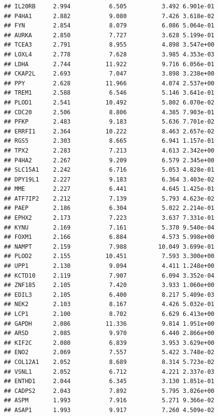\documentclass{article}\usepackage[]{graphicx}\usepackage[]{color}
\makeatletter
\newenvironment{kframe}{%
 \def\at@end@of@kframe{}%
 \ifinner\ifhmode%
  \def\at@end@of@kframe{\end{minipage}}%
  \begin{minipage}{\columnwidth}%
 \fi\fi%
 \def\FrameCommand##1{\hskip\@totalleftmargin \hskip-\fboxsep
 \colorbox{shadecolor}{##1}\hskip-\fboxsep
     \hskip-\linewidth \hskip-\@totalleftmargin \hskip\columnwidth}%
 \MakeFramed {\advance\hsize-\width
   \@totalleftmargin\z@ \linewidth\hsize
   \@setminipage}}%
 {\par\unskip\endMakeFramed%
 \at@end@of@kframe}
\newenvironment{knitrout}{}{} %
\makeatother
\begin{document}
\begin{knitrout}
\begin{kframe}
\begin{verbatim}
## IL20RB     2.994           6.505          3.492 6.901e-01
## P4HA1      2.882           9.080          7.426 3.618e-02
## FYN        2.854           8.079          6.086 5.064e-01
## AURKA      2.850           7.727          3.628 5.199e-01
## TCEA3      2.791           8.955          4.898 3.547e+00
## LOXL4      2.778           7.628          3.985 4.353e-03
## LDHA       2.744          11.922          9.716 6.056e-01
## CKAP2L     2.693           7.047          3.898 3.238e+00
## PPY        2.628          11.966          4.074 2.537e+00
## TREM1      2.588           6.546          5.146 3.641e-01
## PLOD1      2.541          10.492          5.802 6.070e-02
## CDC20      2.506           8.806          4.385 7.903e-01
## PFKP       2.483           9.183          5.636 7.701e-02
## ERRFI1     2.364          10.222          8.463 2.657e-02
## RGS5       2.303           8.665          6.941 1.157e-01
## TPX2       2.283           7.213          4.613 2.342e+00
## P4HA2      2.267           9.209          6.579 2.345e+00
## SLC15A1    2.242           6.716          5.053 4.828e-01
## DPY19L1    2.227           9.183          6.364 3.403e-02
## MME        2.227           6.441          4.645 1.425e-01
## ATF7IP2    2.212           7.139          5.793 4.623e-02
## PAEP       2.186           6.304          5.022 2.214e-01
## EPHX2      2.173           7.223          3.637 7.331e-01
## KYNU       2.169           7.161          5.370 9.540e-04
## FOXM1      2.166           6.884          4.573 5.998e+00
## NAMPT      2.159           7.988         10.049 3.699e-01
## PLOD2      2.155          10.451          7.593 3.300e+00
## UPP1       2.130           9.094          4.411 1.248e+00
## KCTD10     2.119           7.907          6.094 3.352e-04
## ZNF185     2.105           7.420          3.933 1.060e+00
## EDIL3      2.105           6.400          8.217 5.409e-03
## NEK2       2.103           8.167          4.426 5.032e-01
## LCP1       2.100           8.702          6.629 6.413e+00
## GAPDH      2.086          11.336          9.814 1.951e+00
## ARSD       2.085           9.970          6.440 2.866e+00
## KIF2C      2.080           6.839          3.953 3.629e+00
## ENO2       2.069           7.557          5.422 3.748e-02
## COL12A1    2.052           8.689          8.314 5.723e-02
## VSNL1      2.052           6.712          4.221 2.337e-03
## ENTHD1     2.044           6.345          3.130 1.851e-01
## CADPS2     2.043           7.892          5.795 3.026e+00
## ASPM       1.993           7.916          5.271 9.366e-02
## ASAP1      1.993           9.917          7.260 4.509e-02

\end{verbatim}
\end{kframe}
\end{knitrout}
\end{document}
